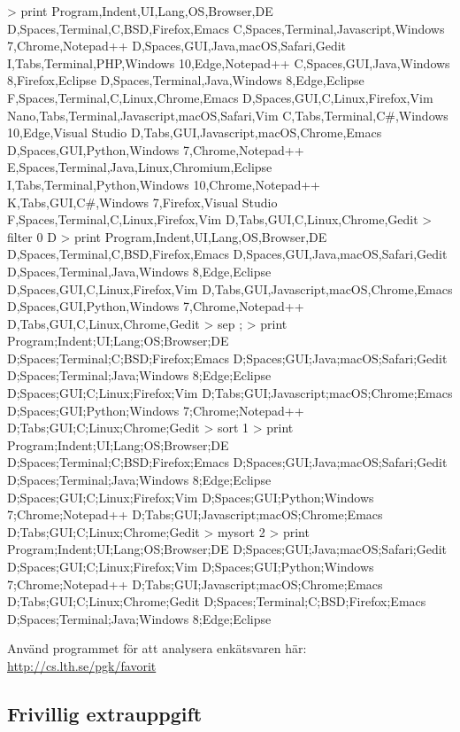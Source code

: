 \begin{REPLnonum}
> print
Program,Indent,UI,Lang,OS,Browser,DE
D,Spaces,Terminal,C,BSD,Firefox,Emacs
C,Spaces,Terminal,Javascript,Windows 7,Chrome,Notepad++
D,Spaces,GUI,Java,macOS,Safari,Gedit
I,Tabs,Terminal,PHP,Windows 10,Edge,Notepad++
C,Spaces,GUI,Java,Windows 8,Firefox,Eclipse
D,Spaces,Terminal,Java,Windows 8,Edge,Eclipse
F,Spaces,Terminal,C,Linux,Chrome,Emacs
D,Spaces,GUI,C,Linux,Firefox,Vim
Nano,Tabs,Terminal,Javascript,macOS,Safari,Vim
C,Tabs,Terminal,C#,Windows 10,Edge,Visual Studio
D,Tabs,GUI,Javascript,macOS,Chrome,Emacs
D,Spaces,GUI,Python,Windows 7,Chrome,Notepad++
E,Spaces,Terminal,Java,Linux,Chromium,Eclipse
I,Tabs,Terminal,Python,Windows 10,Chrome,Notepad++
K,Tabs,GUI,C#,Windows 7,Firefox,Visual Studio
F,Spaces,Terminal,C,Linux,Firefox,Vim
D,Tabs,GUI,C,Linux,Chrome,Gedit
> filter 0 D
> print
Program,Indent,UI,Lang,OS,Browser,DE
D,Spaces,Terminal,C,BSD,Firefox,Emacs
D,Spaces,GUI,Java,macOS,Safari,Gedit
D,Spaces,Terminal,Java,Windows 8,Edge,Eclipse
D,Spaces,GUI,C,Linux,Firefox,Vim
D,Tabs,GUI,Javascript,macOS,Chrome,Emacs
D,Spaces,GUI,Python,Windows 7,Chrome,Notepad++
D,Tabs,GUI,C,Linux,Chrome,Gedit
> sep ;
> print
Program;Indent;UI;Lang;OS;Browser;DE
D;Spaces;Terminal;C;BSD;Firefox;Emacs
D;Spaces;GUI;Java;macOS;Safari;Gedit
D;Spaces;Terminal;Java;Windows 8;Edge;Eclipse
D;Spaces;GUI;C;Linux;Firefox;Vim
D;Tabs;GUI;Javascript;macOS;Chrome;Emacs
D;Spaces;GUI;Python;Windows 7;Chrome;Notepad++
D;Tabs;GUI;C;Linux;Chrome;Gedit
> sort 1
> print
Program;Indent;UI;Lang;OS;Browser;DE
D;Spaces;Terminal;C;BSD;Firefox;Emacs
D;Spaces;GUI;Java;macOS;Safari;Gedit
D;Spaces;Terminal;Java;Windows 8;Edge;Eclipse
D;Spaces;GUI;C;Linux;Firefox;Vim
D;Spaces;GUI;Python;Windows 7;Chrome;Notepad++
D;Tabs;GUI;Javascript;macOS;Chrome;Emacs
D;Tabs;GUI;C;Linux;Chrome;Gedit
> mysort 2
> print
Program;Indent;UI;Lang;OS;Browser;DE
D;Spaces;GUI;Java;macOS;Safari;Gedit
D;Spaces;GUI;C;Linux;Firefox;Vim
D;Spaces;GUI;Python;Windows 7;Chrome;Notepad++
D;Tabs;GUI;Javascript;macOS;Chrome;Emacs
D;Tabs;GUI;C;Linux;Chrome;Gedit
D;Spaces;Terminal;C;BSD;Firefox;Emacs
D;Spaces;Terminal;Java;Windows 8;Edge;Eclipse
\end{REPLnonum}

\Task Använd programmet för att analysera enkätsvaren här:\\  \url{http://cs.lth.se/pgk/favorit}

\clearpage

\subsection{Frivillig extrauppgift}


